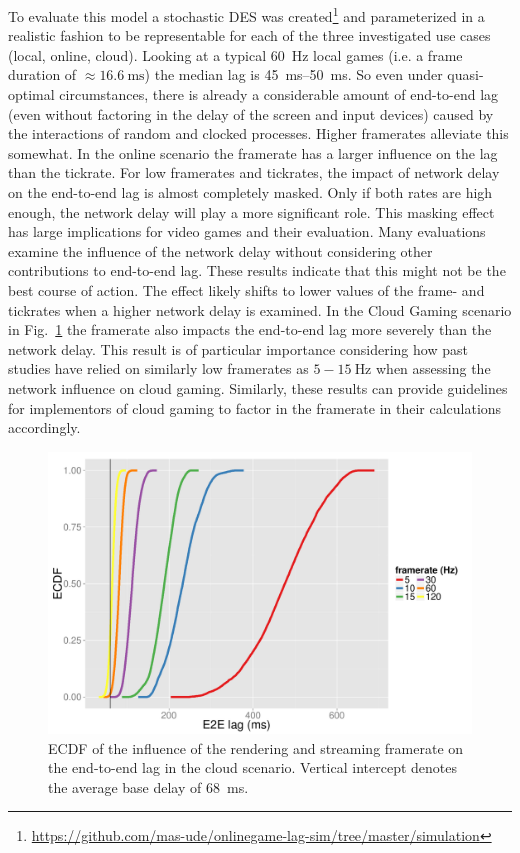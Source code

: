 To evaluate this model a stochastic \gls{DES} was created\footnote{\url{https://github.com/mas-ude/onlinegame-lag-sim/tree/master/simulation}} and parameterized in a realistic fashion to be representable for each of the three investigated use cases (local, online, cloud). Looking at a typical \SI{60}{\hertz} local games (i.e. a frame duration of $\approx \SI{16.6}{\milli\second}$) the median lag is \SIrange{45}{50}{\milli\second}. So even under quasi-optimal circumstances, there is already a considerable amount of end-to-end lag (even without factoring in the delay of the screen and input devices) caused by the interactions of random and clocked processes. Higher framerates alleviate this somewhat. In the online scenario the framerate has a larger influence on the lag than the tickrate. For low framerates and tickrates, the impact of network delay on the end-to-end lag is almost completely masked. Only if both rates are high enough, the network delay will play a more significant role. This masking effect has large implications for video games and their evaluation. Many evaluations examine the influence of the network delay without considering other contributions to end-to-end lag. These results indicate that this might not be the best course of action. The effect likely shifts to lower values of the frame- and tickrates when a higher network delay is examined. In the Cloud Gaming scenario in Fig.~\ref{fig:cloud-e2e-delay-sim} the framerate also impacts the end-to-end lag more severely than the network delay. This result is of particular importance considering how past studies have relied on similarly low framerates as $5-\SI{15}{\hertz}$ when assessing the network influence on cloud gaming. Similarly, these results can provide guidelines for implementors of cloud gaming to factor in the framerate in their calculations accordingly.

\begin{figure}[!t]
	\centering
	\includegraphics[width=1.0\columnwidth]{../../simulation/visualization/cloudgaming-lag-cdf.pdf}
	\caption{\acrshort{ECDF} of the influence of the rendering and streaming framerate on the end-to-end lag in the cloud scenario. Vertical intercept denotes the average base delay of \SI{68}{\milli\second}.}
\label{fig:cloud-e2e-delay-sim}
\end{figure}


